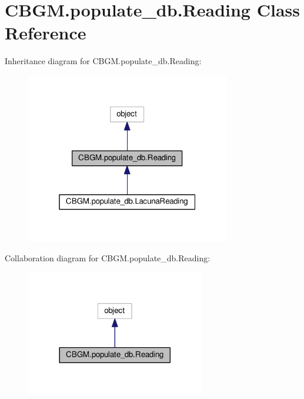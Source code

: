 \hypertarget{classCBGM_1_1populate__db_1_1Reading}{}\section{C\+B\+G\+M.\+populate\+\_\+db.\+Reading Class Reference}
\label{classCBGM_1_1populate__db_1_1Reading}


Inheritance diagram for C\+B\+G\+M.\+populate\+\_\+db.\+Reading\+:\nopagebreak
\begin{figure}[H]
\begin{center}
\leavevmode
\includegraphics[width=253pt]{classCBGM_1_1populate__db_1_1Reading__inherit__graph}
\end{center}
\end{figure}


Collaboration diagram for C\+B\+G\+M.\+populate\+\_\+db.\+Reading\+:\nopagebreak
\begin{figure}[H]
\begin{center}
\leavevmode
\includegraphics[width=221pt]{classCBGM_1_1populate__db_1_1Reading__coll__graph}
\end{center}
\end{figure}
